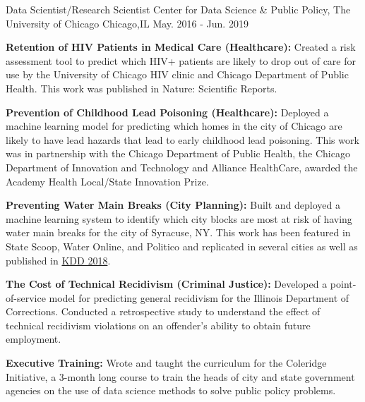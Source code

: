 \begin{cventries}
\cventry
    {Data Scientist/Research Scientist} %
    {Center for Data Science \& Public Policy, The University of Chicago} %
    {Chicago,IL} %
    {May. 2016 - Jun. 2019} %
    {\begin{cvitems}
        \setlength\itemsep{.15em}
        \item { \textbf{Retention of HIV Patients in Medical Care (Healthcare): }Created a risk assessment tool to predict which HIV+ patients are likely to drop out of care for use by the University of Chicago HIV clinic and Chicago Department of Public Health. This work was published in Nature: Scientific Reports.}
        \item { \textbf{Prevention of Childhood Lead Poisoning (Healthcare): }Deployed a machine learning model for predicting which homes in the city of Chicago are likely to have lead hazards that lead to early childhood lead poisoning. This work was in  partnership with the Chicago Department of Public Health, the Chicago Department of Innovation and Technology and Alliance HealthCare, awarded the Academy Health Local/State Innovation Prize.}
         \item { \textbf{Preventing Water Main Breaks (City Planning): }Built and deployed a machine learning system to identify which city blocks are most at risk of having water main breaks for the city of Syracuse, NY. This work has been featured in State Scoop, Water Online, and Politico and replicated in several cities as well as published in \href{https://arxiv.org/abs/1805.03597}{KDD 2018}.}
         \item { \textbf{The Cost of Technical Recidivism (Criminal Justice): }Developed a point-of-service model for predicting general recidivism for the Illinois Department of Corrections. Conducted a retrospective study to understand the effect of technical recidivism violations on an offender's ability to obtain future employment.}
         \item{ \textbf{Executive Training: }Wrote and taught the curriculum for the Coleridge Initiative, a 3-month long course to train the heads of city and state government agencies on the use of data science methods to solve public policy problems.}
     \end{cvitems}}




\end{cventries}
